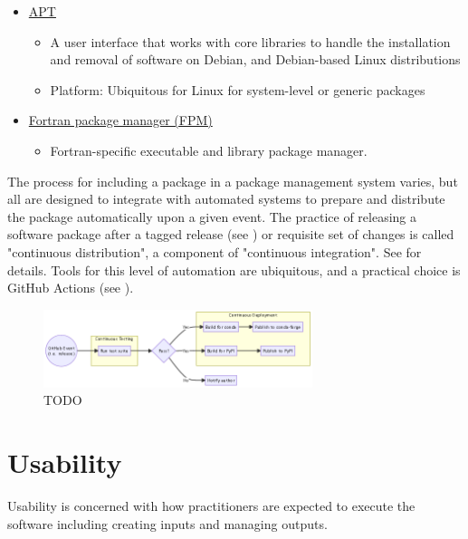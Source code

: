 \documentclass[]{nrel}
\begin{document}
\begin{itemize}
\item \href{https://en.wikipedia.org/wiki/APT\_(software)}{APT}
\begin{itemize}
\item A user interface that works with core libraries to handle the installation and removal of software on Debian, and Debian-based Linux distributions
\item Platform: Ubiquitous for Linux for system-level or generic packages
\end{itemize}

\item \href{https://fpm.fortran-lang.org/index.html}{Fortran package manager (FPM)}
\begin{itemize}
\item Fortran-specific executable and library package manager.
\end{itemize}

\end{itemize}

The process for including a package in a package management system varies, but all are designed
to integrate with automated systems to prepare and distribute the package automatically upon
a given event. The practice of releasing a software package after a tagged release
(see ) or requisite set of changes is called "continuous distribution",
a component of "continuous integration". See  for details.
Tools for this level of automation are ubiquitous, and a practical choice
is GitHub Actions (see ).

\begin{figure}[htbp] \begin{center}
\includegraphics[width=0.7\textwidth]{mermaid-ece5068b3a6eb10d6392a7ca035a7cc4736d3183.png}
\caption{TODO}
\label{fig:fig1} \end{center} \end{figure}


\chapter{Usability}
Usability is concerned with how practitioners are expected to execute the software including
creating inputs and managing outputs.
\end{document}
